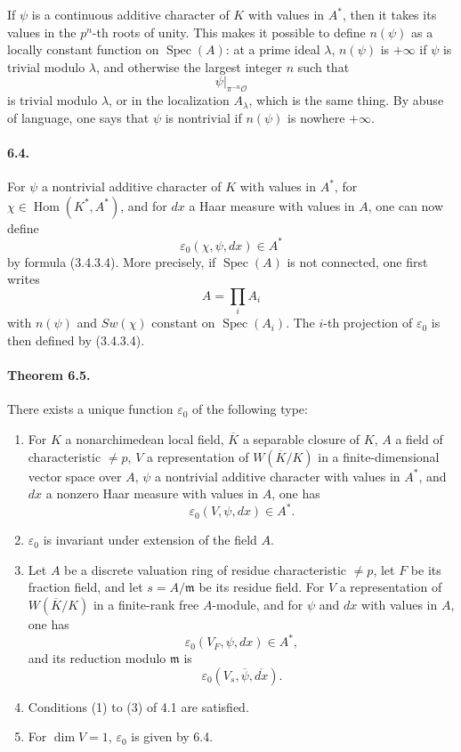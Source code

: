 \documentclass[10pt,letterpaper]{article}
\newcommand{\Hom}{\operatorname{Hom}}
\newcommand{\Spec}{\operatorname{Spec}}
\providecommand{\Spec}{\operatorname{Spec}}
\providecommand{\Hom}{\operatorname{Hom}}
\providecommand{\Hom}{\operatorname{Hom}}
\providecommand{\Spec}{\operatorname{Spec}}
\providecommand{\Spec}{\operatorname{Spec}}
\providecommand{\Hom}{\operatorname{Hom}}
\begin{document}
If \(\psi\) is a continuous additive character of \(K\) with values in \(A^*\), then it takes its values in the \(p^n\)-th roots of unity. This makes it possible to define \(n(\psi)\) as a locally constant function on \(\Spec(A)\): at a prime ideal \(\lambda\), \(n(\psi)\) is \(+\infty\) if \(\psi\) is trivial modulo \(\lambda\), and otherwise the largest integer \(n\) such that
\[
\psi|_{\pi^{-n}\mathcal O}
\]
is trivial modulo \(\lambda\), or in the localization \(A_\lambda\), which is the same thing. By abuse of language, one says that \(\psi\) is nontrivial if \(n(\psi)\) is nowhere \(+\infty\).

\paragraph{6.4.} For \(\psi\) a nontrivial additive character of \(K\) with values in \(A^*\), for \(\chi\in\Hom(K^*,A^*)\), and for \(dx\) a Haar measure with values in \(A\), one can now define
\[
\varepsilon_0(\chi,\psi,dx)\in A^*
\]
by formula (3.4.3.4). More precisely, if \(\Spec(A)\) is not connected, one first writes
\[
A=\prod_i A_i
\]
with \(n(\psi)\) and \(Sw(\chi)\) constant on \(\Spec(A_i)\). The \(i\)-th projection of \(\varepsilon_0\) is then defined by (3.4.3.4).

\paragraph{Theorem 6.5.} There exists a unique function \(\varepsilon_0\) of the following type:
\begin{enumerate}[label=(\alph*)]
\item For \(K\) a nonarchimedean local field, \(\overline K\) a separable closure of \(K\), \(A\) a field of characteristic \(\ne p\), \(V\) a representation of \(W(\overline K/K)\) in a finite-dimensional vector space over \(A\), \(\psi\) a nontrivial additive character with values in \(A^*\), and \(dx\) a nonzero Haar measure with values in \(A\), one has
\[
\varepsilon_0(V,\psi,dx)\in A^*.
\]
\item \(\varepsilon_0\) is invariant under extension of the field \(A\).
\item Let \(A\) be a discrete valuation ring of residue characteristic \(\ne p\), let \(F\) be its fraction field, and let \(s=A/\mathfrak m\) be its residue field. For \(V\) a representation of \(W(\overline K/K)\) in a finite-rank free \(A\)-module, and for \(\psi\) and \(dx\) with values in \(A\), one has
\[
\varepsilon_0(V_F,\psi,dx)\in A^*,
\]
and its reduction modulo \(\mathfrak m\) is
\[
\varepsilon_0(V_s,\overline\psi,\overline{dx}).
\]
\item Conditions (1) to (3) of 4.1 are satisfied.
\item For \(\dim V=1\), \(\varepsilon_0\) is given by 6.4.
\end{enumerate}
\end{document}
